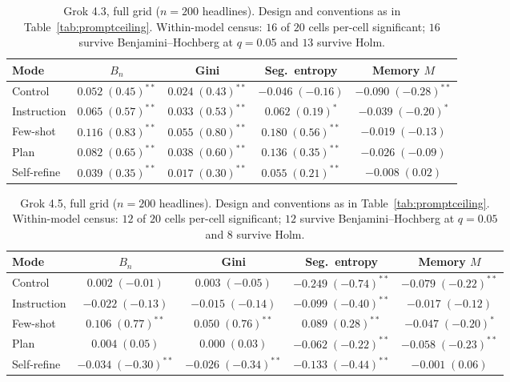 \begin{table}[htbp]
\centering
\small
\caption{Grok 4.3, full grid ($n=200$ headlines). Design and conventions as in Table~\ref{tab:promptceiling}. Within-model census: $16$ of $20$ cells per-cell significant; $16$ survive Benjamini--Hochberg at $q=0.05$ and $13$ survive Holm.}
\label{tab:grid-grok43}
\begin{tabular}{lcccc}
\toprule
Mode & $B_n$ & Gini & Seg.\ entropy & Memory $M$ \\
\midrule
Control & $0.052\;(0.45)^{**}$ & $0.024\;(0.43)^{**}$ & $-0.046\;(-0.16)$ & $-0.090\;(-0.28)^{**}$ \\
Instruction & $0.065\;(0.57)^{**}$ & $0.033\;(0.53)^{**}$ & $0.062\;(0.19)^{*}$ & $-0.039\;(-0.20)^{*}$ \\
Few-shot & $0.116\;(0.83)^{**}$ & $0.055\;(0.80)^{**}$ & $0.180\;(0.56)^{**}$ & $-0.019\;(-0.13)$ \\
Plan & $0.082\;(0.65)^{**}$ & $0.038\;(0.60)^{**}$ & $0.136\;(0.35)^{**}$ & $-0.026\;(-0.09)$ \\
Self-refine & $0.039\;(0.35)^{**}$ & $0.017\;(0.30)^{**}$ & $0.055\;(0.21)^{**}$ & $-0.008\;(0.02)$ \\
\bottomrule
\end{tabular}
\end{table}

\begin{table}[htbp]
\centering
\small
\caption{Grok 4.5, full grid ($n=200$ headlines). Design and conventions as in Table~\ref{tab:promptceiling}. Within-model census: $12$ of $20$ cells per-cell significant; $12$ survive Benjamini--Hochberg at $q=0.05$ and $8$ survive Holm.}
\label{tab:grid-grok45}
\begin{tabular}{lcccc}
\toprule
Mode & $B_n$ & Gini & Seg.\ entropy & Memory $M$ \\
\midrule
Control & $0.002\;(-0.01)$ & $0.003\;(-0.05)$ & $-0.249\;(-0.74)^{**}$ & $-0.079\;(-0.22)^{**}$ \\
Instruction & $-0.022\;(-0.13)$ & $-0.015\;(-0.14)$ & $-0.099\;(-0.40)^{**}$ & $-0.017\;(-0.12)$ \\
Few-shot & $0.106\;(0.77)^{**}$ & $0.050\;(0.76)^{**}$ & $0.089\;(0.28)^{**}$ & $-0.047\;(-0.20)^{*}$ \\
Plan & $0.004\;(0.05)$ & $0.000\;(0.03)$ & $-0.062\;(-0.22)^{**}$ & $-0.058\;(-0.23)^{**}$ \\
Self-refine & $-0.034\;(-0.30)^{**}$ & $-0.026\;(-0.34)^{**}$ & $-0.133\;(-0.44)^{**}$ & $-0.001\;(0.06)$ \\
\bottomrule
\end{tabular}
\end{table}
